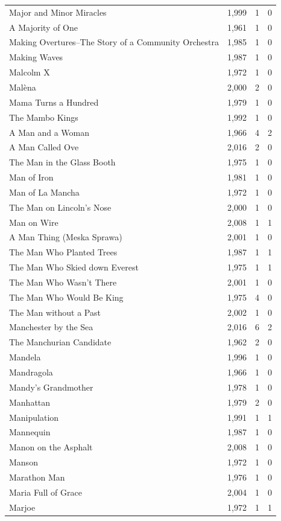 \begin{tabular}{lrrr}
Major and Minor Miracles & 1,999 & 1 & 0 \\
A Majority of One & 1,961 & 1 & 0 \\
Making Overtures--The Story of a Community Orchestra & 1,985 & 1 & 0 \\
Making Waves & 1,987 & 1 & 0 \\
Malcolm X & 1,972 & 1 & 0 \\
Malèna & 2,000 & 2 & 0 \\
Mama Turns a Hundred & 1,979 & 1 & 0 \\
The Mambo Kings & 1,992 & 1 & 0 \\
A Man and a Woman & 1,966 & 4 & 2 \\
A Man Called Ove & 2,016 & 2 & 0 \\
The Man in the Glass Booth & 1,975 & 1 & 0 \\
Man of Iron & 1,981 & 1 & 0 \\
Man of La Mancha & 1,972 & 1 & 0 \\
The Man on Lincoln's Nose & 2,000 & 1 & 0 \\
Man on Wire & 2,008 & 1 & 1 \\
A Man Thing (Meska Sprawa) & 2,001 & 1 & 0 \\
The Man Who Planted Trees & 1,987 & 1 & 1 \\
The Man Who Skied down Everest & 1,975 & 1 & 1 \\
The Man Who Wasn't There & 2,001 & 1 & 0 \\
The Man Who Would Be King & 1,975 & 4 & 0 \\
The Man without a Past & 2,002 & 1 & 0 \\
Manchester by the Sea & 2,016 & 6 & 2 \\
The Manchurian Candidate & 1,962 & 2 & 0 \\
Mandela & 1,996 & 1 & 0 \\
Mandragola & 1,966 & 1 & 0 \\
Mandy's Grandmother & 1,978 & 1 & 0 \\
Manhattan & 1,979 & 2 & 0 \\
Manipulation & 1,991 & 1 & 1 \\
Mannequin & 1,987 & 1 & 0 \\
Manon on the Asphalt & 2,008 & 1 & 0 \\
Manson & 1,972 & 1 & 0 \\
Marathon Man & 1,976 & 1 & 0 \\
Maria Full of Grace & 2,004 & 1 & 0 \\
Marjoe & 1,972 & 1 & 1 \\

\end{tabular}
